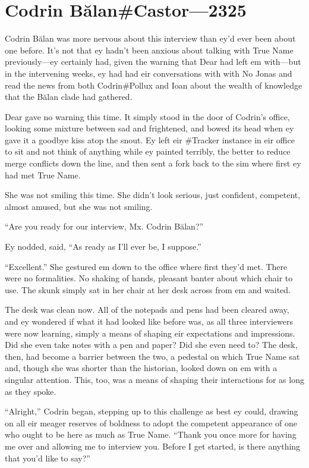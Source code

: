 \hypertarget{codrin-bux103lancastor-2325}{%
\chapter{Codrin Bălan\#Castor---2325}\label{codrin-bux103lancastor-2325}}

Codrin Bălan was more nervous about this interview than ey'd ever been about one before. It's not that ey hadn't been anxious about talking with True Name previously---ey certainly had, given the warning that Dear had left em with---but in the intervening weeks, ey had had eir conversations with with No Jonas and read the news from both Codrin\#Pollux and Ioan about the wealth of knowledge that the Bălan clade had gathered.

Dear gave no warning this time. It simply stood in the door of Codrin's office, looking some mixture between sad and frightened, and bowed its head when ey gave it a goodbye kiss atop the snout. Ey left eir \#Tracker instance in eir office to sit and not think of anything while ey painted terribly, the better to reduce merge conflicts down the line, and then sent a fork back to the sim where first ey had met True Name.

She was not smiling this time. She didn't look serious, just confident, competent, almost amused, but she was not smiling.

``Are you ready for our interview, Mx. Codrin Bălan?''

Ey nodded, said, ``As ready as I'll ever be, I suppose.''

``Excellent.'' She gestured em down to the office where first they'd met. There were no formalities. No shaking of hands, pleasant banter about which chair to use. The skunk simply sat in her chair at her desk across from em and waited.

The desk was clean now. All of the notepads and pens had been cleared away, and ey wondered if what it had looked like before was, as all three interviewers were now learning, simply a means of shaping eir expectations and impressions. Did she even take notes with a pen and paper? Did she even need to? The desk, then, had become a barrier between the two, a pedestal on which True Name sat and, though she was shorter than the historian, looked down on em with a singular attention. This, too, was a means of shaping their interactions for as long as they spoke.

``Alright,'' Codrin began, stepping up to this challenge as best ey could, drawing on all eir meager reserves of boldness to adopt the competent appearance of one who ought to be here as much as True Name. ``Thank you once more for having me over and allowing me to interview you. Before I get started, is there anything that you'd like to say?''

